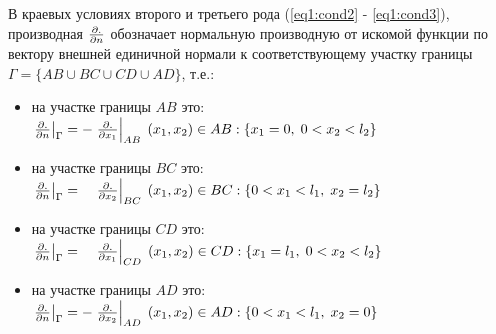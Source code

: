 В краевых условиях второго и третьего рода (\ref{eq1:cond2} - \ref{eq1:cond3}), производная $ \frac{\partial .}{\partial n} $ обозначает нормальную производную от искомой функции по вектору внешней единичной нормали к соответствующему участку границы $ \Gamma = \{AB \cup BC \cup CD \cup AD \} $, т.е.:

\begin{itemize}
\item на участке границы $AB$ это: \; $ \left. \frac{\partial .}{\partial n} \right|_{\Gamma} = - \left. \frac{\partial .}{\partial x_{1}} \right|_{AB}
\; (x_{1},x_{2}) \in AB : \{ x_{1} = 0,\; 0 < x_{2} < l_{2} \}$
\item на участке границы $BC$ это: \; $ \left. \frac{\partial .}{\partial n} \right|_{\Gamma} = \phantom{-} \left. \frac{\partial .}{\partial x_{2}} \right|_{BC}
\; (x_{1},x_{2}) \in BC : \{ 0 < x_{1} < l_{1},\; x_{2} = l_{2} \}$
\item на участке границы $CD$ это: \; $ \left. \frac{\partial .}{\partial n} \right|_{\Gamma} = \phantom{-} \left. \frac{\partial .}{\partial x_{1}} \right|_{CD}
\; (x_{1},x_{2}) \in CD : \{ x_{1} = l_{1},\; 0 < x_{2} < l_{2} \}$
\item на участке границы $AD$ это: \; $ \left. \frac{\partial .}{\partial n} \right|_{\Gamma} = -\left. \frac{\partial .}{\partial x_{2}} \right|_{AD}
\; (x_{1},x_{2}) \in AD : \{ 0 < x_{1} < l_{1},\; x_{2} = 0 \}$
\end{itemize}